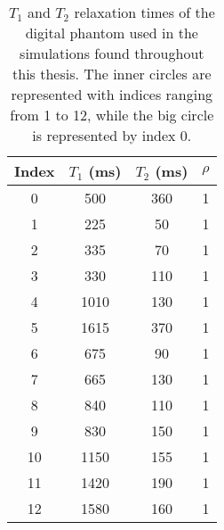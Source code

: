 \begin{table}[h!]
\centering
 \begin{tabular}{||c c c c ||} 
 \hline
 Index & $T_1$ (ms) & $T_2$ (ms) & $\rho$ \\ [0.5ex] 
 \hline\hline
 0 & 500 & 360 & 1 \\
 \hline
 1 & 225 & 50  & 1  \\ 
 \hline
 2 & 335 & 70  & 1  \\
 \hline
 3 & 330 & 110  & 1  \\
 \hline
 4 & 1010 & 130  & 1  \\
 \hline
 5 & 1615 & 370  & 1 \\ 
 \hline
 6 & 675 & 90  & 1 \\ 
 \hline
 7 & 665 & 130  & 1 \\ 
 \hline
 8 & 840 & 110  & 1 \\ 
 \hline
 9 & 830 & 150  & 1 \\ 
 \hline
 10 & 1150 & 155  & 1 \\ 
 \hline
 11 & 1420 & 190  & 1 \\ 
 \hline
 12 & 1580 & 160  & 1 \\ 
 \hline
\end{tabular}
\caption{$T_1$ and $T_2$ relaxation times of the digital phantom used in the simulations found throughout this thesis. The inner circles are represented with indices ranging from 1 to 12, while the big circle is represented by index 0.}
\label{table:1}
\end{table}